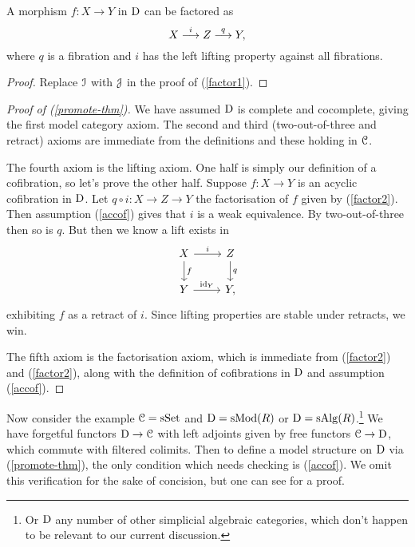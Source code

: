 \begin{lemma}
  \label{factor2}
  A morphism $f : X \to Y$ in $\mathrm{D}$ can be factored as
  \[
  X \overset{i}{\longrightarrow} Z \overset{q}{\longrightarrow} Y,
  \]
  where $q$ is a fibration and $i$ has the left lifting property
  against all fibrations.
\end{lemma}

\begin{proof}
  Replace $\mathcal{I}$ with $\mathcal{J}$ in the proof of (\ref{factor1}).
\end{proof}


\begin{proof}[Proof of (\ref{promote-thm})]
  We have assumed $\mathrm{D}$ is complete and cocomplete, giving the first
  model category axiom. The second and third (two-out-of-three and
  retract) axioms are immediate from the definitions and these holding
  in $\mathcal{C}$.

  The fourth axiom is the lifting axiom. One half is simply our
  definition of a cofibration, so let's prove the other half. Suppose
  $f : X \to Y$ is an acyclic cofibration in $\mathrm{D}$. Let $q \circ i : X
  \to Z \to Y$ the factorisation of $f$ given by (\ref{factor2}). Then
  assumption (\ref{accof}) gives that $i$ is a weak equivalence. By
  two-out-of-three then so is $q$. But then we know a lift exists in
  \[
  \begin{tikzcd}
    X \rar{i} \dar{f} & Z \dar{q} \\ Y \rar{\id_Y} & Y,
  \end{tikzcd}
  \]
  exhibiting $f$ as a retract of $i$. Since lifting properties are
  stable under retracts, we win.

  The fifth axiom is the factorisation axiom, which is immediate from
  (\ref{factor2}) and (\ref{factor2}), along with the definition of
  cofibrations in $\mathrm{D}$ and assumption (\ref{accof}).
\end{proof}

\begin{nothing}
  \label{relevant-model}
  Now consider the example $\mathcal{C} = \mathrm{s}\mathrm{Set}$ and $\mathrm{D} = \mathrm{s}\mathrm{Mod}(R)$ or $\mathrm{D} =
  \mathrm{s}\mathrm{Alg}(R)$.\footnote{Or $\mathrm{D}$ any number of other simplicial
    algebraic categories, which don't happen to be relevant to our
    current discussion.}  We have forgetful functors $\mathrm{D} \to \mathcal{C}$ with
  left adjoints given by free functors $\mathcal{C} \to \mathrm{D}$, which commute with
  filtered colimits. Then to define a model structure on $\mathrm{D}$ via
  (\ref{promote-thm}), the only condition which needs checking is
  (\ref{accof}). We omit this verification for the sake of concision,
  but one can see \cite{goerssjardine} for a proof.
\end{nothing}

